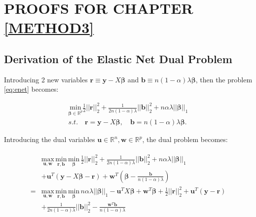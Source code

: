 \appendix
\singlespace
\chapter{PROOFS FOR CHAPTER \ref{METHOD3}}
\section{Derivation of the Elastic Net Dual Problem}


Introducing 2 new variables $\boldsymbol r\equiv \boldsymbol y-X\boldsymbol\beta$ and $\boldsymbol b\equiv n(1-\alpha)\lambda \boldsymbol\beta$, then the problem \eqref{eq:enet} becomes:

\begin{equation}
    \label{eq:dual+rb}
    \begin{gathered}
    \underset{\boldsymbol\beta\in \mathbb{R}^p}{\mathrm{min}}\frac{1}{2}||\boldsymbol r||_2^2+\frac{1}{2n(1-\alpha)\lambda}||\boldsymbol b||_2^2+n\alpha\lambda||\boldsymbol\beta||_1\\s.t.\quad \boldsymbol r=\boldsymbol y-X\boldsymbol\beta,\quad \boldsymbol b=n(1-\alpha)\lambda \boldsymbol\beta.
\end{gathered}
\end{equation}

Introducing the dual variables $\boldsymbol u\in\mathbb{R}^{n},\boldsymbol w\in\mathbb{R}^p$, the dual problem becomes:

\begin{gather}
    \label{eq:dual+uw}
    \begin{aligned}
        &\underset{\boldsymbol u,\boldsymbol w}{\mathrm{max}}\,\underset{\boldsymbol r,\boldsymbol b}{\mathrm{min}}\,\underset{\boldsymbol\beta}{\mathrm{min}}\,\frac{1}{2}||\boldsymbol r||_2^2+\frac{1}{2n(1-\alpha)\lambda}||\boldsymbol b||_2^2+n\alpha\lambda||\boldsymbol\beta||_1\\
        &+\boldsymbol u^T(\boldsymbol y-X\boldsymbol\beta-\boldsymbol r)+\boldsymbol w^T\left(\boldsymbol\beta-\frac{\boldsymbol b}{n(1-\alpha)\lambda}\right)\\
        =&\underset{\boldsymbol u,\boldsymbol w}{\mathrm{max}}\,\underset{\boldsymbol r,\boldsymbol b}{\mathrm{min}}\,\underset{\boldsymbol\beta}{\mathrm{min}}\,n\alpha\lambda||\boldsymbol\beta||_1-\boldsymbol u^TX\boldsymbol\beta+\boldsymbol w^T\boldsymbol\beta+\frac{1}{2}||\boldsymbol r||_2^2+\boldsymbol u^T(\boldsymbol y-\boldsymbol r)\\
        &+\frac{1}{2n(1-\alpha)\lambda}||\boldsymbol b||_2^2-\frac{\boldsymbol w^T\boldsymbol b}{n(1-\alpha)\lambda}
    \end{aligned}    
\end{gather}


